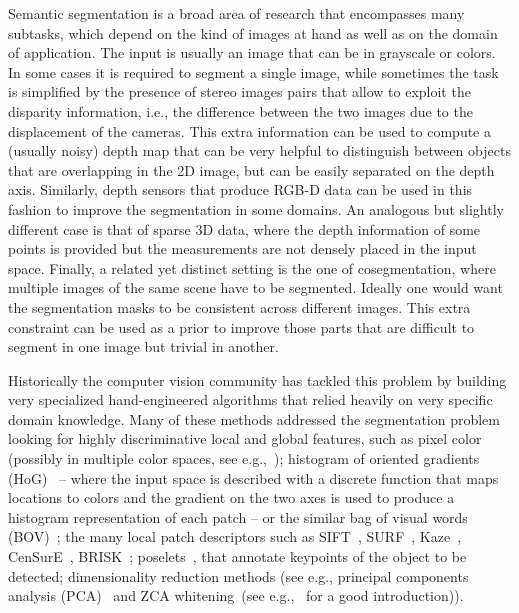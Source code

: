 Semantic segmentation is a broad area of research that encompasses many
subtasks, which depend on the kind of images at hand as well as on the domain
of application. The input is usually an image that can be in grayscale or
colors.  In some cases it is required to segment a single image, while
sometimes the task is simplified by the presence of stereo images pairs that
allow to exploit the disparity information, i.e., the difference between the
two images due to the displacement of the cameras. This extra information can
be used to compute a (usually noisy) depth map that can be very helpful to
distinguish between objects that are overlapping in the 2D image, but can be
easily separated on the depth axis. Similarly, depth sensors that produce RGB-D
data can be used in this fashion to improve the segmentation in some domains.
An analogous but slightly different case is that of sparse 3D data, where the
depth information of some points is provided but the measurements are not
densely placed in the input space.
Finally, a related yet distinct setting is the one of cosegmentation, where
multiple images of the same scene have to be segmented. Ideally one would want
the segmentation masks to be consistent across different images. This extra
constraint can be used as a prior to improve those parts that are difficult to
segment in one image but trivial in another.

Historically the computer vision community has tackled this problem by building
very specialized hand-engineered algorithms that relied heavily on very
specific domain knowledge. Many of these methods addressed the segmentation
problem looking for highly discriminative local and global features, such as
pixel color (possibly in multiple color spaces, see e.g.,~\citep{
cheng2001color}); histogram of oriented gradients (HoG)~\citep{Dalal05,
bourdev2010detecting,felzenszwalb2010object} -- where the input space is
described with a discrete function that maps locations to colors and the
gradient on the two axes is used to produce a histogram representation of each
patch -- or the similar bag of visual words (BOV)~\citep{csurka2004visual}; the
many local patch descriptors such as SIFT~\citep{lowe2004distinctive},
SURF~\citep{bay2008speeded}, Kaze~\citep{alcantarilla2012kaze}, CenSurE~\citep{
agrawal2008censure}, BRISK~\citep{leutenegger2011brisk}; poselets~\citep{
brox2011object,bourdev2010detecting}, that annotate keypoints of the object to
be detected; dimensionality reduction methods (see e.g., principal components
analysis (PCA)~\citep{smith2002tutorial,shlens2014tutorial,chen2011pixel} and
ZCA whitening~(see e.g.,~\citep{KrizhevskyHinton2009} for a good
introduction)).

